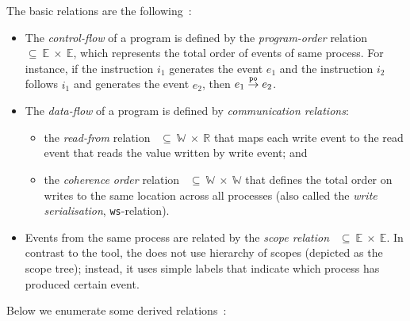 \vspace{1em}
The basic relations are the following~\cite{alglave2010shared}:
\begin{itemize}
    \item The \textit{control-flow} of a program is defined by the \textit{program-order} relation \po~$\subseteq~\mathbb{E}~\times~\mathbb{E}$, which represents the total order of events of same process.
    For instance, if the instruction $i_1$ generates the event $e_1$ and the instruction $i_2$ follows $i_1$ and generates the event $e_2$, then $e_1 \overset{\texttt{po}}{\rightarrow} e_2$.

    \item The \textit{data-flow} of a program is defined by \textit{communication relations}:
    \begin{itemize}[noitemsep]
        \item the \textit{read-from} relation \rf{}~$\subseteq~\mathbb{W}~\times~\mathbb{R}$ that maps each write event to the read event that reads the value written by write event; and
        \item the \textit{coherence order} relation \co{}~$\subseteq~\mathbb{W}~\times~\mathbb{W}$ that defines the total order on writes to the same location across all processes (also called the \textit{write serialisation}, \texttt{ws}-relation).
    \end{itemize}

    \item Events from the same process are related by the \textit{scope relation} \sr{}~$\subseteq~\mathbb{E}~\times~\mathbb{E}$.
    In contrast to the  tool, the \porthos[2] does not use hierarchy of scopes (depicted as the scope tree); instead, it uses simple labels that indicate which process has produced certain event.
\end{itemize}


Below we enumerate some derived relations~\cite{alglave2010shared}:


